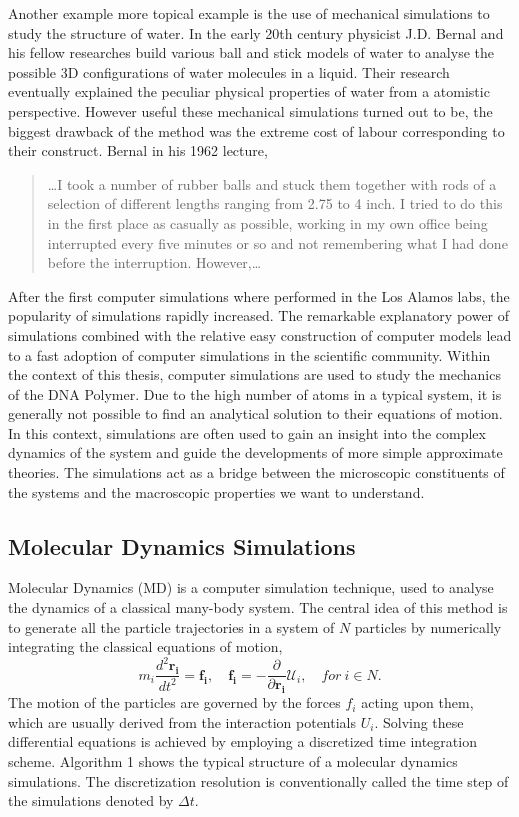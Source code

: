 Another example more topical example is the use of mechanical simulations to study the
structure of water.  In the early 20th century physicist J.D. Bernal and his fellow
researches build various ball and stick models of water to analyse the possible 3D
configurations of water molecules in a liquid. Their research eventually explained the
peculiar physical properties of water from a atomistic perspective. However useful these
mechanical simulations turned out to be, the biggest drawback of the method was the
extreme cost of labour corresponding to their construct. Bernal in his 1962 lecture,

\begin{quote}
\dots I took a number of rubber balls and stuck them together with rods of a
selection of different lengths ranging from 2.75 to 4 inch. I tried to do this in the
first place as casually as possible, working in my own office being interrupted every
five minutes or so and not remembering what I had done before the interruption.
However,\dots
\end{quote}

After the first computer simulations where performed in the Los Alamos labs, the
popularity of simulations rapidly increased. The remarkable explanatory power of
simulations combined with the relative easy construction of computer models lead to a
fast adoption of computer simulations in the scientific community. Within the context of
this thesis, computer simulations are used to study the mechanics of
the DNA Polymer. Due to the high number of atoms in a typical system, it is generally
not possible to find an analytical solution to their equations of motion. In this
context, simulations are often used to gain an insight into the complex dynamics of the
system and guide the developments of more simple approximate theories. The simulations
act as a bridge between the microscopic constituents of the systems and the macroscopic
properties we want to understand.


\subsection{Molecular Dynamics Simulations}
Molecular Dynamics (MD) is a computer simulation technique, used to analyse
the dynamics of a classical many-body system. The central idea of this method is to
generate all the particle trajectories in a system of $N$ particles by numerically
integrating the classical equations of motion,
\[
m_i \frac{d^2 \boldsymbol{r_i}}{dt^2} = \boldsymbol{f_i}, \quad \boldsymbol{f_i} = -
    \frac{\partial}{\partial \boldsymbol{r_i}} \mathcal{U}_i, \quad for\ i \in N.
\]
The motion of the particles are governed by the forces $f_i$ acting upon them, which are
usually derived from the interaction potentials $U_i$.
Solving these differential equations is achieved by employing a discretized time
integration scheme.  Algorithm 1 shows the typical structure of a molecular dynamics
simulations. The discretization resolution is conventionally called the time step of the
simulations denoted by $\Delta t$.\\

